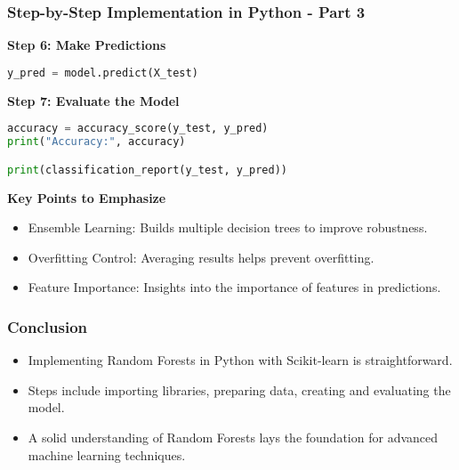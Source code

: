 \documentclass[aspectratio=169]{beamer}
\begin{document}
\begin{frame}[fragile]
    \frametitle{Step-by-Step Implementation in Python - Part 3}
    \textbf{Step 6: Make Predictions}
    
    \begin{lstlisting}[language=Python]
y_pred = model.predict(X_test)
    \end{lstlisting}

    \textbf{Step 7: Evaluate the Model}
    
    \begin{lstlisting}[language=Python]
accuracy = accuracy_score(y_test, y_pred)
print("Accuracy:", accuracy)

print(classification_report(y_test, y_pred))
    \end{lstlisting}

    \textbf{Key Points to Emphasize}
    \begin{itemize}
        \item Ensemble Learning: Builds multiple decision trees to improve robustness.
        \item Overfitting Control: Averaging results helps prevent overfitting.
        \item Feature Importance: Insights into the importance of features in predictions.
    \end{itemize}
\end{frame}

\begin{frame}
    \frametitle{Conclusion}
    \begin{itemize}
        \item Implementing Random Forests in Python with Scikit-learn is straightforward.
        \item Steps include importing libraries, preparing data, creating and evaluating the model.
        \item A solid understanding of Random Forests lays the foundation for advanced machine learning techniques.
    \end{itemize}
\end{frame}
\end{document}
